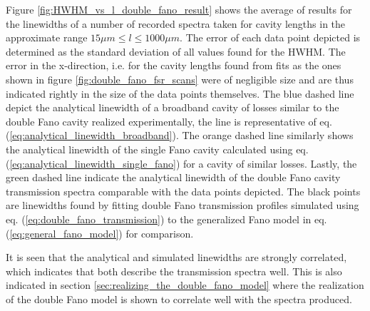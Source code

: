 Figure \ref{fig:HWHM_vs_l_double_fano_result} shows the average of results for the linewidths of a number of recorded spectra taken for cavity lengths in the approximate range $15 \mu m \leq l \leq 1000 \mu m$. The error of each data point depicted is determined as the standard deviation of all values found for the HWHM. The error in the x-direction, i.e. for the cavity lengths found from fits as the ones shown in figure \ref{fig:double_fano_fsr_scans} were of negligible size and are thus indicated rightly in the size of the data points themselves. The blue dashed line depict the analytical linewidth of a broadband cavity of losses similar to the double Fano cavity realized experimentally, the line is representative of eq. (\ref{eq:analytical_linewidth_broadband}). The orange dashed line similarly shows the analytical linewidth of the single Fano cavity calculated using eq. (\ref{eq:analytical_linewidth_single_fano}) for a cavity of similar losses. Lastly, the green dashed line indicate the analytical linewidth of the double Fano cavity transmission spectra comparable with the data points depicted. The black points are linewidths found by fitting double Fano transmission profiles simulated using eq. (\ref{eq:double_fano_transmission}) to the generalized Fano model in eq. (\ref{eq:general_fano_model}) for comparison.

It is seen that the analytical and simulated linewidths are strongly correlated, which indicates that both describe the transmission spectra well. This is also indicated in section \ref{sec:realizing_the_double_fano_model} where the realization of the double Fano model is shown to correlate well with the spectra produced. 


